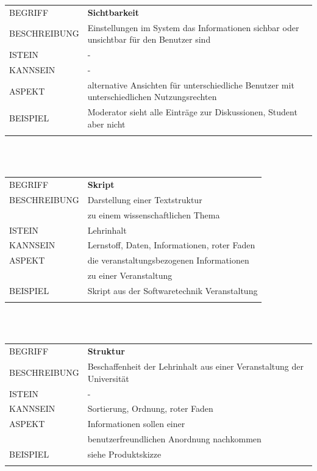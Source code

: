 \documentclass[12pt,a4paper]{article}
\begin{document}
\begin{tabular}{l p{12cm}}
	BEGRIFF 	 & \textbf{Sichtbarkeit} \\ 
	BESCHREIBUNG & Einstellungen im System das Informationen sichbar oder unsichtbar für den Benutzer sind\\ 
	ISTEIN   	 & -\\
	KANNSEIN 	 & -\\ 
	ASPEKT   	 & alternative Ansichten für unterschiedliche Benutzer mit unterschiedlichen Nutzungsrechten \\
	BEISPIEL 	 & Moderator sieht alle Einträge zur Diskussionen, Student aber nicht\\\\
	\hline
\end{tabular}\\\\  


\begin{tabular}{l p{12cm}}
	BEGRIFF 	 & \textbf{Skript} \\ 
	BESCHREIBUNG & Darstellung einer Textstruktur\\
	& zu einem wissenschaftlichen Thema\\ 
	ISTEIN   	 & Lehrinhalt\\
	KANNSEIN 	 & Lernstoff, Daten, Informationen, roter Faden\\ 
	ASPEKT   	 & die veranstaltungsbezogenen Informationen\\
	& zu einer Veranstaltung\\
	BEISPIEL 	 & Skript aus der Softwaretechnik Veranstaltung\\\\
	\hline
\end{tabular}\\\\  

\begin{tabular}{l p{12cm}}
	BEGRIFF 	 & \textbf{Struktur} \\ 
	BESCHREIBUNG & Beschaffenheit der Lehrinhalt aus einer Veranstaltung der 					   Universität\\ 
	ISTEIN   	 & - \\
	KANNSEIN 	 & Sortierung, Ordnung, roter Faden\\ 
	ASPEKT   	 & Informationen sollen einer\\
	& benutzerfreundlichen Anordnung nachkommen\\
	BEISPIEL 	 & siehe Produktskizze\\\\
	\hline
\end{tabular}\\\\ 
\end{document}

